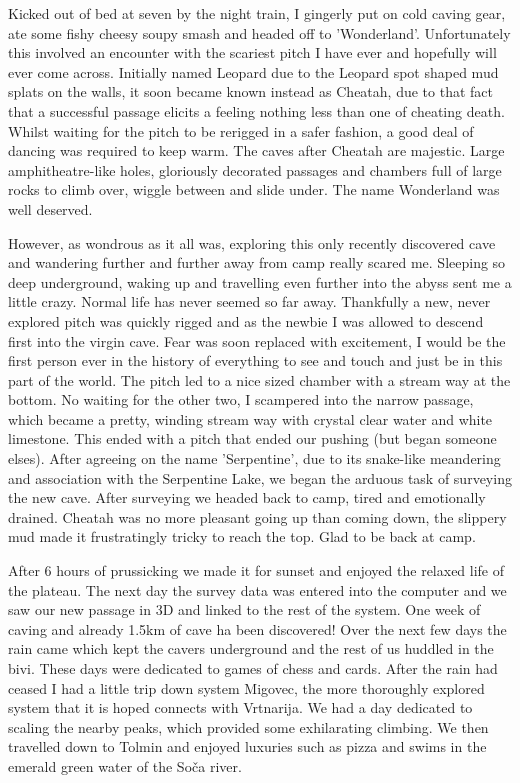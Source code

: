 Kicked out of bed at seven by the night train, I gingerly put on cold caving
gear, ate some fishy cheesy soupy smash and headed off to
'Wonderland'. Unfortunately this involved an encounter with the scariest
pitch I have ever and hopefully will ever come across. Initially named Leopard
due to the Leopard spot shaped mud splats on the walls, it soon became known
instead as Cheatah, due to that fact that a successful passage elicits a
feeling nothing less than one of cheating death. Whilst waiting for the pitch
to be rerigged in a safer fashion, a good deal of dancing was required to keep
warm. The caves after Cheatah are majestic. Large amphitheatre-like holes,
gloriously decorated passages and chambers full of large rocks to climb over,
wiggle between and slide under. The name Wonderland was well deserved.

However, as wondrous as it all was, exploring this only recently discovered
cave and wandering further and further away from camp really scared me.
Sleeping so deep underground, waking up and travelling even further into the
abyss sent me a little crazy. Normal life has never seemed so far away.
Thankfully a new, never explored pitch was quickly rigged and as the newbie I
was allowed to descend first into the virgin cave. Fear was soon replaced with
excitement, I would be the first person ever in the history of everything to
see and touch and just be in this part of the world. The pitch led to a nice
sized chamber with a stream way at the bottom. No waiting for the other two, I
scampered into the narrow passage, which became a pretty, winding stream way
with crystal clear water and white limestone. This ended with a pitch that
ended our pushing (but began someone elses). After agreeing on the name
'Serpentine', due to its snake-like meandering and association with the
Serpentine Lake, we began the arduous task of surveying the new cave. After
surveying we headed back to camp, tired and emotionally drained. Cheatah was no
more pleasant going up than coming down, the slippery mud made it frustratingly
tricky to reach the top. Glad to be back at camp.

After 6 hours of prussicking we made it for sunset and enjoyed the relaxed life
of the plateau. The next day the survey data was entered into the computer and
we saw our new passage in 3D and linked to the rest of the system. One week of
caving and already 1.5km of cave ha been discovered! Over the next few days the
rain came which kept the cavers underground and the rest of us huddled in the
bivi. These days were dedicated to games of chess and cards. After the rain had
ceased I had a little trip down system Migovec, the more thoroughly explored
system that it is hoped connects with Vrtnarija. We had a day dedicated to
scaling the nearby peaks, which provided some exhilarating climbing. We then
travelled down to Tolmin and enjoyed luxuries such as pizza and swims in the
emerald green water of the So\v{c}a river.

